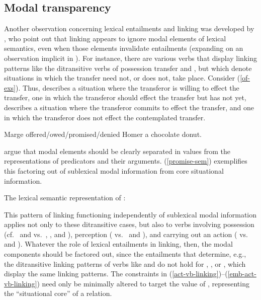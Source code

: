 \documentclass[output=paper,biblatex,babelshorthands,newtxmath,draftmode,colorlinks, citecolor=brown]{langscibook}
\begin{document}
\subsection{Modal transparency}
Another observation concerning lexical entailments and linking was developed by \citet{KoenigandDavis2001}, who point out that linking appears to ignore modal elements of lexical semantics, even when those elements invalidate entailments (expanding on an observation implicit in \citealt{Goldberg1995}).
For instance, there are various  verbs that display linking patterns like the ditransitive verbs of possession transfer  and , but which denote situations in which the transfer need not, or does not, take place. Consider (\ref{of-exs}).
Thus,  describes a situation where the transferor is willing to effect the transfer,  one in which the transferor should effect the transfer but has not yet,  describes a situation where the transferor commits to effect the transfer, and  one in which the transferor does not effect the contemplated transfer. 

\begin{exe}
\ex \label{of-exs}Marge offered/owed/promised/denied Homer a chocolate donut.
\end{exe}

\citeauthor{KoenigandDavis2001} argue that modal elements should be clearly separated in \content
values from the representations of predicators and their arguments.  (\ref{promise-sem}) exemplifies
this factoring out of sublexical modal information from core situational information. 
\begin{exe}
\ex\label{promise-sem} The lexical semantic representation of  
\citep[101]{KoenigandDavis2001}:\\
\end{exe}
This pattern of linking functioning independently of sublexical modal information applies not only to these ditransitive cases, but also to verbs involving possession (cf.\  and  vs.\ , , and ), perception ( vs.\  and ), and carrying out an action ( vs.\  and ).  Whatever the role of lexical entailments in linking, then, the modal components should be factored out, since the entailments that determine, e.g., the ditransitive linking patterns of verbs like  and  do not hold for , , or , which display the same linking patterns. The constraints in (\ref{act-vb-linking})--(\ref{emb-act-vb-linking}) need only be minimally altered to target the value of , representing the ``situational core'' of a relation.
\end{document}
